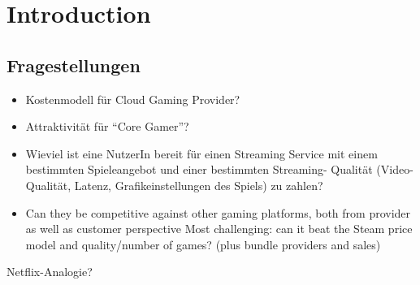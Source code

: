\section{Introduction}

\subsection{Fragestellungen}

\begin{itemize}
	\item Kostenmodell für Cloud Gaming Provider?
	\item Attraktivität für “Core Gamer”?
	\item Wieviel ist eine NutzerIn bereit für einen Streaming Service mit einem bestimmten Spieleangebot und einer bestimmten Streaming- Qualität (Video-Qualität, Latenz, Grafikeinstellungen des Spiels) zu zahlen?
	\item Can they be competitive against other gaming platforms, both from provider as well as customer perspective
			Most challenging: can it beat the Steam price model and quality/number of games? (plus bundle providers and sales)
\end{itemize}

Netflix-Analogie? 